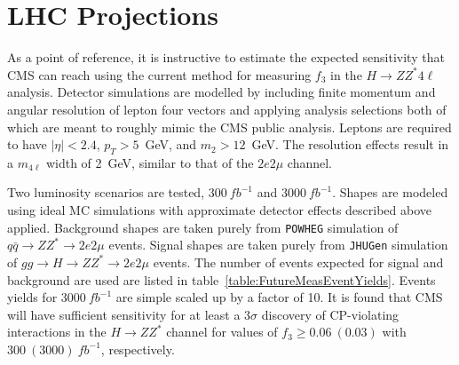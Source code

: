 \section{LHC Projections}

As a point of reference, it is instructive to estimate the
expected sensitivity that CMS can reach using the current method
for measuring $f_3$ in the $H\to ZZ^*4\ell$ analysis.  Detector
simulations are modelled by 
including finite momentum and angular resolution of lepton
four vectors and applying analysis selections both of which are
meant to roughly mimic the CMS public analysis.  Leptons are
required to have $|\eta|<2.4$, $p_T>5$~GeV, and $m_2>12$~GeV.
The resolution effects result in a $m_{4\ell}$ width of 2~GeV, 
similar to that of the $2e2\mu$ channel.  

Two luminosity scenarios are tested, $300~fb^{-1}$ and 
$3000~fb^{-1}$.  Shapes are modeled using ideal MC simulations
with approximate detector effects described above applied.
Background shapes are taken purely from \verb+POWHEG+ simulation
of $q\bar{q}\to ZZ^*\to 2e2\mu$ events.  Signal shapes are
taken purely from \verb+JHUGen+ simulation of 
$gg\to H\to ZZ^*\to 2e2\mu$ events.  
The number of events expected for signal and background are 
used are listed in table~\ref{table:FutureMeasEventYields}.
Events yields for $3000~fb^{-1}$ are simple scaled up by 
a factor of 10. 
It is found that CMS will have sufficient sensitivity for
at least a $3\sigma$ discovery of CP-violating interactions in 
the $H\to ZZ^*$ channel for values of $f_{3}\geq0.06~(0.03)$
 with $300~(3000)~fb^{-1}$, respectively.

